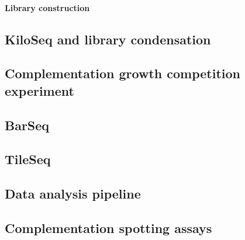 \paragraph{Library construction}

\subsection{KiloSeq and library condensation}

\subsection{Complementation growth competition experiment}

\subsection{BarSeq}

\subsection{TileSeq}

\subsection{Data analysis pipeline}

\subsection{Complementation spotting assays}
